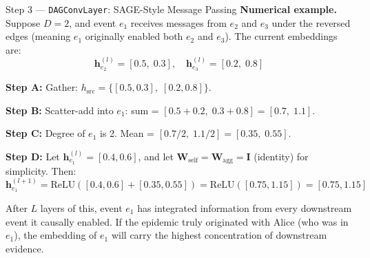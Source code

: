 \begin{codewalk}{Step 3 --- \texttt{DAGConvLayer}: SAGE-Style Message Passing}
\textbf{Numerical example.}
Suppose $D = 2$, and event $e_1$ receives messages from $e_2$ and $e_3$ under
the reversed edges (meaning $e_1$ originally enabled both $e_2$ and $e_3$).
The current embeddings are:
\[
    \mathbf{h}_{e_2}^{(l)} = [0.5,\; 0.3], \quad
    \mathbf{h}_{e_3}^{(l)} = [0.2,\; 0.8]
\]

\textbf{Step A:} Gather: $h_{\text{src}} = \{[0.5, 0.3],\; [0.2, 0.8]\}$.

\textbf{Step B:} Scatter-add into $e_1$: sum = $[0.5+0.2,\; 0.3+0.8] = [0.7,\; 1.1]$.

\textbf{Step C:} Degree of $e_1$ is 2. Mean = $[0.7/2,\; 1.1/2] = [0.35,\; 0.55]$.

\textbf{Step D:} Let $\mathbf{h}_{e_1}^{(l)} = [0.4, 0.6]$, and let
$\mathbf{W}_{\text{self}} = \mathbf{W}_{\text{agg}} = \mathbf{I}$ (identity)
for simplicity. Then:
\[
    \mathbf{h}_{e_1}^{(l+1)} = \text{ReLU}([0.4, 0.6] + [0.35, 0.55])
    = \text{ReLU}([0.75, 1.15]) = [0.75, 1.15]
\]

After $L$ layers of this, event $e_1$ has integrated information from every
downstream event it causally enabled. If the epidemic truly originated with
Alice (who was in $e_1$), the embedding of $e_1$ will carry the highest
concentration of downstream evidence.
\end{codewalk}

